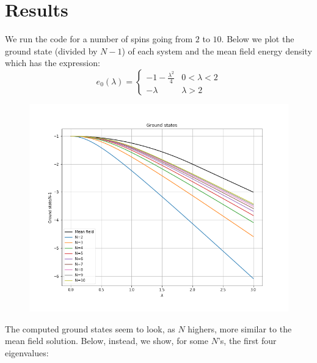 \documentclass{article}
\begin{document}
\section*{Results}
We run the code for a number of spins going from $2$ to $10$. Below we plot the ground state (divided by $N-1$) of each system and the mean field energy density which has the expression:
\begin{equation}
	e_0(\lambda)=\begin{cases}
	-1-\frac{\lambda^2}{4} & 0 < \lambda < 2 \\
	-\lambda & \lambda > 2
	\end{cases}
\end{equation}
\begin{center}
	\begin{figure}[h!]
		\includegraphics[width=\linewidth]{images/groundstates.png}
	\end{figure}
\end{center}
The computed ground states seem to look, as $N$ highers, more similar to the mean field solution. Below, instead, we show, for some $N$'s, the first four eigenvalues:
\end{document}
